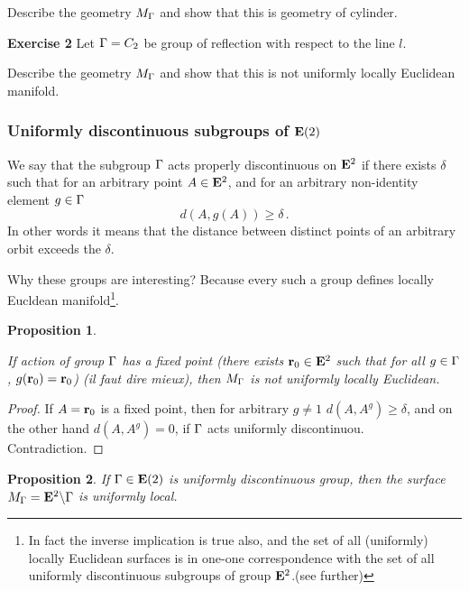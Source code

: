 \documentclass[12pt]{article}
\newtheorem{proposition}{Proposition}
\theoremstyle{definition}
\numberwithin{equation}{section}
\begin{document}
  Describe the geometry $M_{\Gamma}$
and show that this is geometry of cylinder.



\m

{\bf Exercise 2}  Let ${\Gamma}=C_2$ be group of reflection
with respect to the line $l$.

  Describe the geometry $M_{\Gamma}$
and show that this is not uniformly locally Euclidean manifold.

  



\subsubsection 
{Uniformly discontinuous subgroups of ${\bf E}(2)$}

We say that the subgroup ${\Gamma}$ acts properly discontinuous
on ${\bf E}^2$ if there exists $\delta$ such that
for an arbitrary point $A\in {\bf E}^2$, and for an arbitrary
non-identity element $g\in {\Gamma}$ 
        $$
      d(A,g(A))\geq \delta\,.
        $$
 In other words it means that the distance between 
distinct points of an arbitrary orbit exceeds the  $\delta$.

Why these groups are interesting?  
Because every such a group
defines locally Eucldean manifold\footnote
{In fact the inverse implication is true also,
 and 
the set of all
 (uniformly) locally Euclidean surfaces
is in one-one correspondence with the
set of all uniformly discontinuous subgroups
of group ${\bf E}^2$.(see further)}.  



\begin{proposition}\label{1}

If action of group ${\Gamma}$ has a fixed point
 (there exists ${\bf r}_0\in {\bf E}^2$ such that 
for all $g\in {\Gamma}$,
$g({\bf r}_0)={\bf r}_0$) ({\it il faut dire mieux}),
then $M_{\Gamma}$ is not uniformly locally 
Euclidean.
\end {proposition}
\begin{proof}
 If $A={\bf r}_0$ is a fixed point, then
for arbitrary $g\not=1$  $d(A,A^g)\geq \delta$, and
on the other hand $d(A,A^g)=0$, if ${\Gamma}$ 
acts uniformly discontinuou. Contradiction.
\end{proof}


\begin{proposition}\label{2}
If ${\Gamma}\in {\bf E}(2)$  is uniformly discontinuous group, then
the surface  $M_{\Gamma}={\bf E}^2\backslash {\Gamma}$ is uniformly local.  

\end{proposition}
\end{document}
